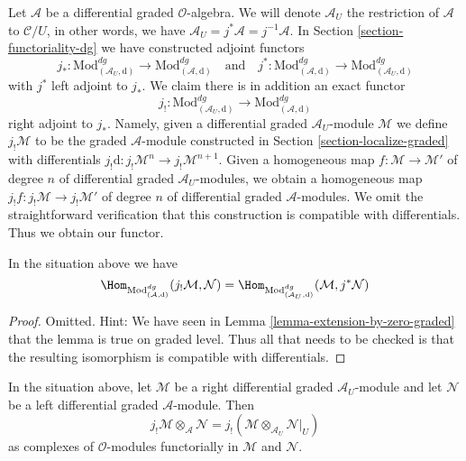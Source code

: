 \medskip\noindent
Let $\mathcal{A}$ be a differential graded $\mathcal{O}$-algebra.
We will denote $\mathcal{A}_U$ the restriction of $\mathcal{A}$
to $\mathcal{C}/U$, in other words, we have
$\mathcal{A}_U = j^*\mathcal{A} = j^{-1}\mathcal{A}$.
In Section \ref{section-functoriality-dg}
we have constructed adjoint functors
$$
j_* :
\text{Mod}^{dg}_{(\mathcal{A}_U, \text{d})}
\longrightarrow
\text{Mod}^{dg}_{(\mathcal{A}, \text{d})}
\quad\text{and}\quad
j^* :
\text{Mod}^{dg}_{(\mathcal{A}, \text{d})}
\longrightarrow
\text{Mod}^{dg}_{(\mathcal{A}_U, \text{d})}
$$
with $j^*$ left adjoint to $j_*$. We claim there is in addition an
exact functor
$$
j_! :
\text{Mod}^{dg}_{(\mathcal{A}_U, \text{d})}
\longrightarrow
\text{Mod}^{dg}_{(\mathcal{A}, \text{d})}
$$
right adjoint to $j_*$. Namely, given a differential graded
$\mathcal{A}_U$-module $\mathcal{M}$ we define $j_!\mathcal{M}$
to be the graded $\mathcal{A}$-module constructed in
Section \ref{section-localize-graded}
with differentials
$j_!\text{d} : j_!\mathcal{M}^n \to j_!\mathcal{M}^{n + 1}$.
Given a homogeneous map
$f : \mathcal{M} \to \mathcal{M}'$ of degree $n$ of differential graded
$\mathcal{A}_U$-modules, we obtain a homogeneous map
$j_!f : j_!\mathcal{M} \to j_!\mathcal{M}'$ of degree $n$
of differential graded $\mathcal{A}$-modules. We omit the
straightforward verification
that this construction is compatible with differentials.
Thus we obtain our functor.

\begin{lemma}
\label{lemma-extension-by-zero-dg}
In the situation above we have
$$
\Hom_{\text{Mod}_{(\mathcal{A}, \text{d})}^{dg}}(
j_!\mathcal{M}, \mathcal{N}) =
\Hom_{\text{Mod}_{(\mathcal{A}_U, \text{d})}^{dg}}(
\mathcal{M}, j^*\mathcal{N})
$$
\end{lemma}

\begin{proof}
Omitted. Hint: We have seen in Lemma \ref{lemma-extension-by-zero-graded}
that the lemma is true on graded level. Thus all that needs to be
checked is that the resulting isomorphism is compatible with differentials.
\end{proof}

\begin{lemma}
\label{lemma-tensor-with-extension-by-zero-dg}
In the situation above, let $\mathcal{M}$ be a right differential graded
$\mathcal{A}_U$-module and let $\mathcal{N}$ be a left differential graded
$\mathcal{A}$-module. Then
$$
j_!\mathcal{M} \otimes_\mathcal{A} \mathcal{N} =
j_!(\mathcal{M} \otimes_{\mathcal{A}_U} \mathcal{N}|_U)
$$
as complexes of $\mathcal{O}$-modules
functorially in $\mathcal{M}$ and $\mathcal{N}$.
\end{lemma}

